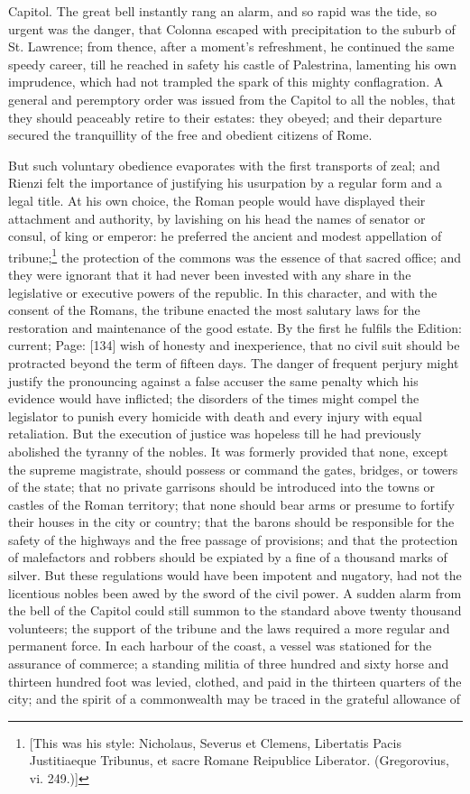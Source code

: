 Capitol. The great bell instantly rang an alarm, and so rapid was the tide, so urgent was the danger, that Colonna escaped with precipitation to the suburb of St. Lawrence; from thence, after a moment\texthebrew{}’s refreshment, he continued the same speedy career, till he reached in safety his castle of Palestrina, lamenting his own imprudence, which had not trampled the spark of this mighty conflagration. A general and peremptory order was issued from the Capitol to all the nobles, that they should peaceably retire to their estates: they obeyed; and their departure secured the tranquillity of the free and obedient citizens of Rome.

But such voluntary obedience evaporates with the first transports of zeal; and Rienzi felt the importance of justifying his usurpation by a regular form and a legal title. At his own choice, the Roman people would have displayed their attachment and authority, by lavishing on his head the names of senator or consul, of king or emperor: he preferred the ancient and modest appellation of tribune;\footnote{[This was his style: Nicholaus, Severus et Clemens, Libertatis Pacis Justitiaeque Tribunus, et sacre Romane Reipublice Liberator. (Gregorovius, vi. 249.)]} the protection of the commons was the essence of that sacred office; and they were ignorant that it had never been invested with any share in the legislative or executive powers of the republic. In this character, and with the consent of the Romans, the tribune enacted the most salutary laws for the restoration and maintenance of the good estate. By the first he fulfils the Edition: current; Page: [134] wish of honesty and inexperience, that no civil suit should be protracted beyond the term of fifteen days. The danger of frequent perjury might justify the pronouncing against a false accuser the same penalty which his evidence would have inflicted; the disorders of the times might compel the legislator to punish every homicide with death and every injury with equal retaliation. But the execution of justice was hopeless till he had previously abolished the tyranny of the nobles. It was formerly provided that none, except the supreme magistrate, should possess or command the gates, bridges, or towers of the state; that no private garrisons should be introduced into the towns or castles of the Roman territory; that none should bear arms or presume to fortify their houses in the city or country; that the barons should be responsible for the safety of the highways and the free passage of provisions; and that the protection of malefactors and robbers should be expiated by a fine of a thousand marks of silver. But these regulations would have been impotent and nugatory, had not the licentious nobles been awed by the sword of the civil power. A sudden alarm from the bell of the Capitol could still summon to the standard above twenty thousand volunteers; the support of the tribune and the laws required a more regular and permanent force. In each harbour of the coast, a vessel was stationed for the assurance of commerce; a standing militia of three hundred and sixty horse and thirteen hundred foot was levied, clothed, and paid in the thirteen quarters of the city; and the spirit of a commonwealth may be traced in the grateful allowance of 